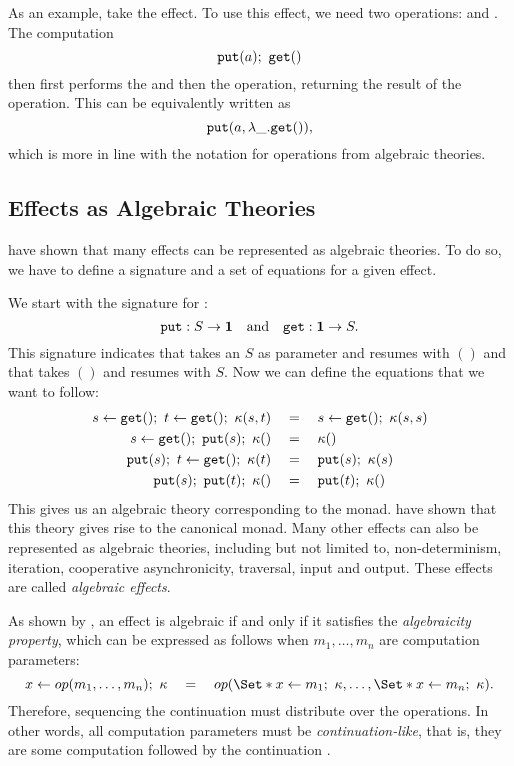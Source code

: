 As an example, take the  effect. To use this effect, we need two operations:  and . The computation
\[ \mathtt{put}(a);\  \mathtt{get}() \]
then first performs the \oput and then the \oget operation, returning the result of the \oget operation. This can be equivalently written as
\[ \mathtt{put}(a, \lambda \_. \mathtt{get}()), \]
which is more in line with the notation for operations from algebraic theories.

\subsection{Effects as Algebraic Theories}

\textcite{goos_adequacy_2001} have shown that many effects can be represented as algebraic theories. To do so, we have to define a signature and a set of equations for a given effect.

We start with the signature for :
\[
    \mathtt{put} : S \to \mathbf{1}
    \quad\text{and}\quad
    \mathtt{get} : \mathbf{1} \to S.
\]
This signature indicates that \oput takes an $S$ as parameter and resumes with $()$ and that \oget takes $()$ and resumes with $S$. Now we can define the equations that we want  to follow:
\begin{align*}
    s \gets \mathtt{get}() ;\  t \gets \mathtt{get}() ;\  \kappa(s,t)
        &\quad=\quad s \gets \mathtt{get}();\  \kappa(s, s) \\
    s \gets\mathtt{get}();\  \mathtt{put}(s);\  \kappa() &\quad=\quad \kappa () \\
    \mathtt{put}(s);\  t\gets\mathtt{get}();\  \kappa(t) &\quad=\quad \mathtt{put}(s);\  \kappa(s) \\
    \mathtt{put}(s);\  \mathtt{put}(t);\  \kappa() &\quad=\quad \mathtt{put}(t);\  \kappa()
\end{align*}
This gives us an algebraic theory corresponding to the  monad. \textcite{goos_adequacy_2001} have shown that this theory gives rise to the canonical  monad. Many other effects can also be represented as algebraic theories, including but not limited to, non-determinism, iteration, cooperative asynchronicity, traversal, input and output\citationneeded. These effects are called \emph{algebraic effects}.

As shown by \textcite{plotkin_algebraic_2003}, an effect is algebraic if and only if it satisfies the \emph{algebraicity property}, which can be expressed as follows when $m_1, \dots, m_n$ are computation parameters:
\[
    x \gets op(m_1, \dots, m_n)\seq \kappa \quad=\quad op(\S{x \gets m_1\seq \kappa}, \dots, \S{x \gets m_n\seq\kappa}).
\]
Therefore, sequencing the continuation must distribute over the operations. In other words, all computation parameters must be \emph{continuation-like}, that is, they are some computation followed by the continuation \autocite{bach_poulsen_hefty_2023}.


